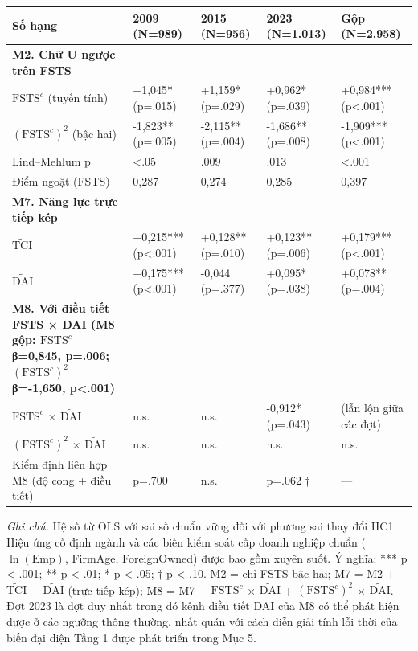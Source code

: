 \documentclass[12pt,a4paper]{article}
\begin{document}
\begin{longtable}[]{@{}lllll@{}}
\toprule\noalign{}
Số hạng & 2009 (N=989) & 2015 (N=956) & 2023 (N=1.013) & Gộp
(N=2.958) \\
\midrule\noalign{}
\endhead
\bottomrule\noalign{}
\endlastfoot
\textbf{M2. Chữ U ngược trên FSTS} & & & & \\
\(\mathrm{FSTS}^{c}\) (tuyến tính) & +1,045* (p=.015) & +1,159* (p=.029)
& +0,962* (p=.039) & +0,984*** (p\textless.001) \\
\((\mathrm{FSTS}^{c})^2\) (bậc hai) & -1,823** (p=.005) & -2,115**
(p=.004) & -1,686** (p=.008) & -1,909*** (p\textless.001) \\
Lind--Mehlum p & \textless.05 & .009 & .013 & \textless.001 \\
Điểm ngoặt (FSTS) & 0,287 & 0,274 & 0,285 & 0,397 \\
\textbf{M7. Năng lực trực tiếp kép} & & & & \\
\(\tilde{\mathrm{TCI}}\) & +0,215*** (p\textless.001) & +0,128**
(p=.010) & +0,123** (p=.006) & +0,179*** (p\textless.001) \\
\(\tilde{\mathrm{DAI}}\) & +0,175*** (p\textless.001) & -0,044 (p=.377)
& +0,095* (p=.038) & +0,078** (p=.004) \\
\textbf{M8. Với điều tiết FSTS × DAI (M8 gộp: \(\mathrm{FSTS}^{c}\)
β=0,845, p=.006; \((\mathrm{FSTS}^{c})^2\) β=-1,650, p\textless.001)} &
& & & \\
\(\mathrm{FSTS}^{c}\) × \(\tilde{\mathrm{DAI}}\) & n.s. & n.s. & -0,912*
(p=.043) & (lẫn lộn giữa các đợt) \\
\((\mathrm{FSTS}^{c})^2\) × \(\tilde{\mathrm{DAI}}\) & n.s. & n.s. &
n.s. & n.s. \\
Kiểm định liên hợp M8 (độ cong + điều tiết) & p=.700 & n.s. & p=.062 † &
--- \\
\end{longtable}

\emph{Ghi chú.} Hệ số từ OLS với sai số chuẩn vững đối với phương sai
thay đổi HC1. Hiệu ứng cố định ngành và các biến kiểm soát cấp doanh
nghiệp chuẩn (\(\ln(\mathrm{Emp})\), FirmAge, ForeignOwned) được bao gồm
xuyên suốt. Ý nghĩa: *** p \textless{} .001; ** p \textless{} .01; * p
\textless{} .05; † p \textless{} .10. M2 = chỉ FSTS bậc hai; M7 = M2 +
\(\tilde{\mathrm{TCI}}\) + \(\tilde{\mathrm{DAI}}\) (trực tiếp kép); M8
= M7 + \(\mathrm{FSTS}^{c}\) × \(\tilde{\mathrm{DAI}}\) +
\((\mathrm{FSTS}^{c})^2\) × \(\tilde{\mathrm{DAI}}\). Đợt 2023 là đợt
duy nhất trong đó kênh điều tiết DAI của M8 có thể phát hiện được ở các
ngưỡng thông thường, nhất quán với cách diễn giải tính lỗi thời của biến
đại diện Tầng 1 được phát triển trong Mục 5.
\end{document}
